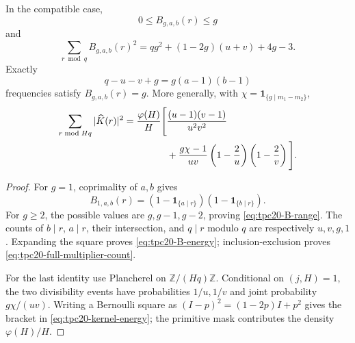 \begin{proposition}
\label{prop:tpc20-multiplier-energy}
In the compatible case,
\begin{equation}
 0\le B_{g,a,b}(r)\le g
 \label{eq:tpc20-B-range}
\end{equation}
and
\begin{equation}
 \sum_{r\bmod q}B_{g,a,b}(r)^2
 =qg^2+(1-2g)(u+v)+4g-3.
 \label{eq:tpc20-B-energy}
\end{equation}
Exactly
\begin{equation}
 q-u-v+g=g(a-1)(b-1)
 \label{eq:tpc20-full-multiplier-count}
\end{equation}
frequencies satisfy \(B_{g,a,b}(r)=g\).  More generally, with
\(\chi=\mathbf 1_{\{g\mid m_1-m_2\}}\),
\begin{align}
 \sum_{r\bmod Hq}|\widehat K(r)|^2
 =\frac{\varphi(H)}H\Bigg[
 &\frac{(u-1)(v-1)}{u^2v^2}
 \notag\\
 &+\frac{g\chi-1}{uv}
 \left(1-\frac2u\right)\left(1-\frac2v\right)
 \Bigg].
 \label{eq:tpc20-kernel-energy}
\end{align}
\end{proposition}

\begin{proof}
For \(g=1\), coprimality of \(a,b\) gives
\[
 B_{1,a,b}(r)
 =(1-\mathbf 1_{\{a\mid r\}})
  (1-\mathbf 1_{\{b\mid r\}}).
\]
For \(g\ge2\), the possible values are \(g,g-1,g-2\), proving
\eqref{eq:tpc20-B-range}.  The counts of \(b\mid r\), \(a\mid r\),
their intersection, and \(q\mid r\) modulo \(q\) are respectively
\(u,v,g,1\).  Expanding the square proves
\eqref{eq:tpc20-B-energy}; inclusion-exclusion proves
\eqref{eq:tpc20-full-multiplier-count}.

For the last identity use Plancherel on \(\mathbb Z/(Hq)\mathbb Z\).
Conditional on \((j,H)=1\), the two divisibility events have
probabilities \(1/u,1/v\) and joint probability \(g\chi/(uv)\).
Writing a Bernoulli square as
\((I-p)^2=(1-2p)I+p^2\) gives the bracket in
\eqref{eq:tpc20-kernel-energy}; the primitive mask contributes the
density \(\varphi(H)/H\).
\end{proof}
